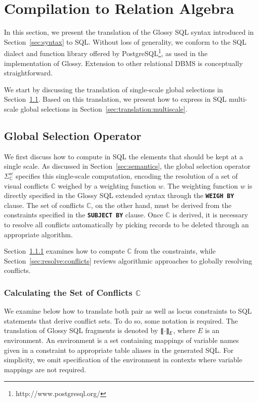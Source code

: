 \documentclass[11pt, oneside]{report}
\newcommand{\denote}[1]{\text{$[\![ $#1$ ]\!]$}}
\begin{document}
{\section{Compilation to Relation Algebra}
\label{sec:sql:translation}

In this section, we present the translation of the Glossy SQL syntax introduced in Section~\ref{sec:syntax} to SQL. Without loss of generality, we conform to the SQL dialect and function library offered by PostgreSQL\footnote{http://www.postgresql.org/}, as used in the implementation of Glossy. Extension to other relational DBMS is conceptually straightforward.  

We start by discussing the translation of single-scale global selections in Section~\ref{sec:translation:global:selection}. Based on this translation, we present how to express in SQL multi-scale global selections in Section~\ref{sec:translation:multiscale}.  

\subsection{Global Selection Operator}
\label{sec:translation:global:selection}

We first discuss how to compute in SQL the elements that should be kept at a single scale. As discussed in Section~\ref{sec:semantics}, the global selection operator $\Sigma_{\mathbb{C}}^{w}$ specifies this single-scale computation, encoding the resolution of a set of visual conflicts $\mathbb{C}$ weighed by a weighting function $w$. The weighting function $w$ is directly specified in the Glossy SQL extended syntax through the \textbf{\texttt{WEIGH BY}} clause. The set of conflicts $\mathbb{C}$, on the other hand, must be derived from the constraints specified in the \textbf{\texttt{SUBJECT BY}} clause. Once $\mathbb{C}$ is derived, it is necessary to resolve all conflicts automatically by picking records to be deleted through an appropriate algorithm.  

Section~\ref{sec:calc:conflicts} examines how to compute $\mathbb{C}$ from the constraints, while Section~\ref{sec:resolve:conflicts} reviews algorithmic approaches to globally resolving conflicts. 

\subsubsection{Calculating the Set of Conflicts $\mathbb{C}$}
\label{sec:calc:conflicts}

We examine below how to translate both pair as well as locus constraints to SQL statements that derive conflict sets. To do so, some notation is required. The translation of Glossy SQL fragments is denoted by $\denote{$\cdot$}_E$, where $E$ is an environment. An environment is a set containing mappings of variable names given in a constraint to appropriate table aliases in the generated SQL. For simplicity, we omit specification of the environment in contexts where variable mappings are not required.  

}
\end{document}
